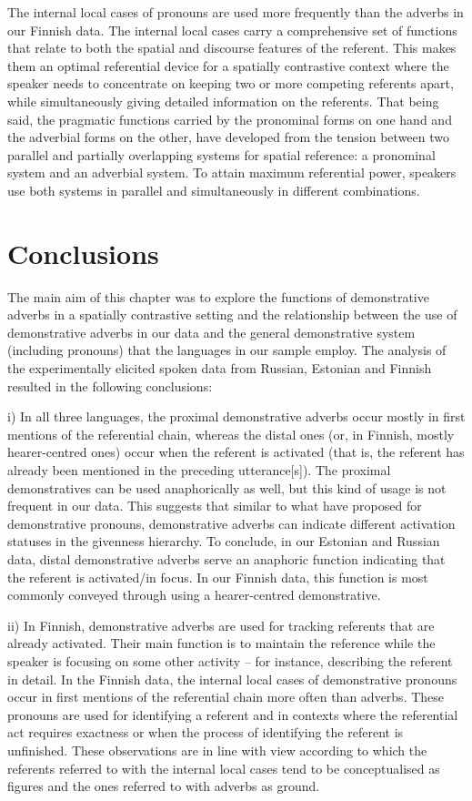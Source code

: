 \documentclass[output=paper,colorlinks,citecolor=brown]{langscibook}
\begin{document}
The internal local cases of pronouns are used more frequently than the adverbs in our Finnish data. The internal local cases carry a comprehensive set of functions that relate to both the spatial and discourse features of the referent. This makes them an optimal referential device for a spatially contrastive context where the speaker needs to concentrate on keeping two or more competing referents apart, while simultaneously giving detailed information on the referents. That being said, the pragmatic functions carried by the pronominal forms on one hand and the adverbial forms on the other, have developed from the tension between two parallel and partially overlapping systems for spatial reference: a pronominal system and an adverbial system. To attain maximum referential power, speakers use both systems in parallel and simultaneously in different combinations. 

\section{Conclusions}\label{sec:nahkola:5}

The main aim of this chapter was to explore the functions of demonstrative adverbs in a spatially contrastive setting and the relationship between the use of demonstrative adverbs in our data and the general demonstrative system (including pronouns) that the languages in our sample employ. The analysis of the experimentally elicited spoken data from Russian, Estonian and Finnish resulted in the following conclusions:

i) In all three languages, the proximal demonstrative adverbs occur mostly in first mentions of the referential chain, whereas the distal ones (or, in Finnish, mostly hearer-centred ones) occur when the referent is activated (that is, the referent has already been mentioned in the preceding utterance[s]). The proximal demonstratives can be used anaphorically as well, but this kind of usage is not frequent in our data. This suggests that similar to what \citep{GundelEtAl1993,GundelEtAl2010} have proposed for demonstrative pronouns, demonstrative adverbs can indicate different activation statuses in the givenness hierarchy. To conclude, in our Estonian and Russian data, distal demonstrative adverbs serve an anaphoric function indicating that the referent is activated/in focus. In our Finnish data, this function is most commonly conveyed through using a hearer-centred demonstrative.

ii) In Finnish, demonstrative adverbs are used for tracking referents that are already activated. Their main function is to maintain the reference while the speaker is focusing on some other activity – for instance, describing the referent in detail. In the Finnish data, the internal local cases of demonstrative pronouns occur in first mentions of the referential chain more often than adverbs. These pronouns are used for identifying a referent and in contexts where the referential act requires exactness or when the process of identifying the referent is unfinished. These observations are in line with  view according to which the referents referred to with the internal local cases tend to be conceptualised as figures and the ones referred to with adverbs as ground.
\end{document}
